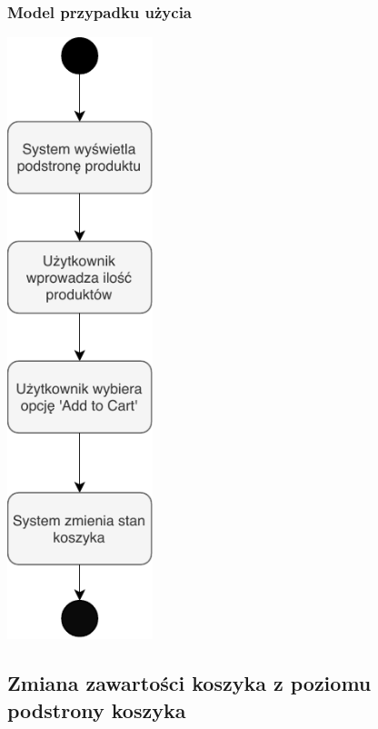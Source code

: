 \documentclass[12pt]{report}
\begin{document}
	\subsubsection{Model przypadku użycia}
	\begin{center}
		\includegraphics[width=120pt]{koszyk1.pdf}
	\end{center}
		
		
	\subsection{Zmiana zawartości koszyka z poziomu podstrony koszyka}
\end{document}
